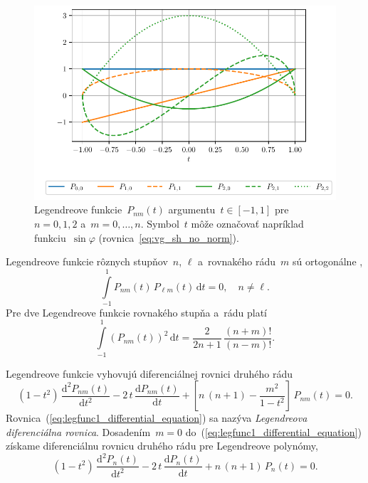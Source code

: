 \documentclass[a4paper, 12pt]{book}
\newcommand{\diff}{\mathrm d}
\begin{document}
\begin{figure}[bt]
\centering
\includegraphics{./fig-legendre-functions.pdf}
\caption{Legendreove funkcie~$P_{nm}(t)$ argumentu~$t \in [-1, 1]$ pre~$n = 0, 
1, 2$ a~$m = 0, \dots, n$.  Symbol~$t$ môže označovať napríklad 
funkciu~$\sin\varphi$ (rovnica~\ref{eq:vg_sh_no_norm}).}
\label{fig:lf}
\end{figure}

Legendreove funkcie rôznych stupňov~$n$, $\ell$ a~rovnakého rádu~$m$ sú
ortogonálne \parencite{Freeden2009},
%
\begin{equation}
\label{eq:pnm_orthogonality}
\int\limits_{-1}^{1} P_{nm}(t) \, P_{\ell m}(t) \, \diff t = 0{,} \quad n \neq 
\ell{.}
\end{equation}
%
Pre dve Legendreove funkcie rovnakého stupňa a~rádu platí
%
\begin{equation}
\label{eq:pnm_times_pnm}
\int\limits_{-1}^{1} \left( P_{nm}(t) \right)^2 \, \diff t = \frac{2}{2n + 1} 
\, \frac{(n + m)!}{(n - m)!}{.}
\end{equation}

Legendreove funkcie vyhovujú diferenciálnej rovnici druhého rádu 
\parencite{SansoGeoidDetermination}
%
\begin{equation}
\label{eq:legfunc1_differential_equation}
(1 - t^2) \, \frac{\diff^2 P_{nm}(t)}{\diff t^2} - 2 \, t \, \frac{\diff 
P_{nm}(t)}{\diff t} + \left[ n \, (n + 1) - \frac{m^2}{1 - t^2} \right] \, 
P_{nm}(t) = 0{.}
\end{equation}
%
Rovnica~(\ref{eq:legfunc1_differential_equation}) sa nazýva \emph{Legendreova 
diferenciálna rovnica}.  Dosadením~$m = 0$ 
do~(\ref{eq:legfunc1_differential_equation}) získame diferenciálnu rovnicu 
druhého rádu pre Legendreove polynómy,
%
\begin{equation}
\label{eq:legpol_differential_equation}
(1 - t^2) \, \frac{\diff^2 P_n(t)}{\diff t^2} - 2 \, t \, \frac{\diff 
P_n(t)}{\diff t} + n \, (n + 1) \, P_n(t) = 0{.}
\end{equation}
\end{document}
